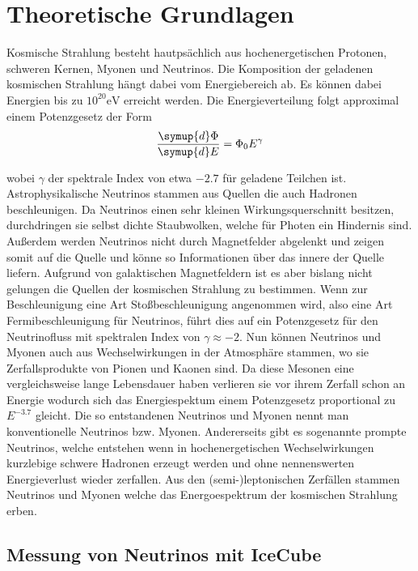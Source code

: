 \section{Theoretische Grundlagen}
\label{sec:theorie}
Kosmische Strahlung besteht hautps\"achlich aus hochenergetischen Protonen, schweren Kernen, Myonen und Neutrinos. Die Komposition der geladenen kosmischen Strahlung h\"angt dabei vom Energiebereich ab. Es k\"onnen dabei Energien bis zu $10^{20} \si{\electronvolt}$ erreicht werden. Die Energieverteilung folgt approximal einem Potenzgesetz der Form
\begin{equation*}
  \frac{\symup{d}\Phi}{\symup{d}E} = \Phi_0 E^{\gamma}
\end{equation*}

wobei $\gamma$ der spektrale Index von etwa $-2.7$ f\"ur geladene Teilchen ist.
Astrophysikalische Neutrinos stammen aus Quellen die auch Hadronen beschleunigen. Da Neutrinos einen sehr kleinen Wirkungsquerschnitt besitzen, durchdringen sie selbst dichte Staubwolken, welche f\"ur Photen ein Hindernis sind. Au\ss erdem werden Neutrinos nicht durch Magnetfelder abgelenkt und zeigen somit auf die Quelle und k\"onne so Informationen \"uber das innere der Quelle liefern.
Aufgrund von galaktischen Magnetfeldern ist es aber bislang nicht gelungen die Quellen der kosmischen Strahlung zu bestimmen.
Wenn zur Beschleunigung eine Art Sto\ss beschleunigung angenommen wird, also eine Art Fermibeschleunigung f\"ur Neutrinos, f\"uhrt dies auf ein Potenzgesetz f\"ur den Neutrinofluss mit spektralen Index von $\gamma \approx -2$.
Nun k\"onnen Neutrinos und Myonen auch aus Wechselwirkungen in der Atmosph\"are stammen, wo sie Zerfallsprodukte von Pionen und Kaonen sind. Da diese Mesonen eine vergleichsweise lange Lebensdauer haben verlieren sie vor ihrem Zerfall schon an Energie wodurch sich das Energiespektum einem Potenzgesetz proportional zu $E^{-3.7}$ gleicht. Die so entstandenen Neutrinos und Myonen nennt man konventionelle Neutrinos bzw. Myonen.
Andererseits gibt es sogenannte prompte Neutrinos, welche entstehen wenn in hochenergetischen Wechselwirkungen kurzlebige schwere Hadronen erzeugt werden und ohne nennenswerten Energieverlust wieder zerfallen. Aus den (semi-)leptonischen Zerf\"allen stammen Neutrinos und Myonen welche das  Energoespektrum der kosmischen Strahlung erben.

\subsection{Messung von Neutrinos mit IceCube}
